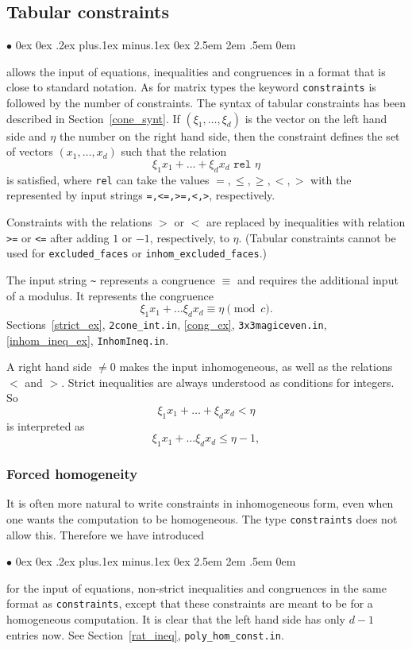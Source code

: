 \documentclass[12pt,a4paper]{scrartcl}
\newcommand{\stdli}{ \topsep0ex \partopsep0ex %
\parsep.2ex plus.1ex minus.1ex \itemsep0ex%
\leftmargin2.5em \labelwidth2em \labelsep.5em \rightmargin0em}%
\renewenvironment{itemize}{\begin{list}{{$\bullet$}}{\stdli}}{\end{list}}
\theoremstyle{definition}
\def\itemtt[#1]{\item[\textbf{\ttt{#1}}]}
\def\ttt{\texttt}
\begin{document}
\subsection{Tabular constraints}

\begin{itemize}
	\itemtt[constraints] allows the input of equations, inequalities and congruences in a format that is close to standard notation. As for matrix types the keyword \verb|constraints| is followed by the number of constraints. The syntax of tabular constraints has been described in Section~\ref{cone_synt}. If $(\xi_1,\dots,\xi_d)$ is the vector on the left hand side and $\eta$ the number on the right hand side, then the constraint defines the set of vectors $(x_1,\dots,x_d)$ such that the relation
	$$
	\xi_1x_1+\dots +\xi_dx_d \texttt{ rel } \eta
	$$
	is satisfied, where \verb|rel| can take the values $=,\leq,\geq,<,>$ with the represented by input strings \verb|=,<=,>=,<,>|, respectively.
	
	Constraints with the relations $>$ or $<$ are replaced by inequalities with relation \verb|>=| or \verb|<=| after adding $1$ or $-1$, respectively, to $ \eta$. (Tabular constraints cannot be used for \verb|excluded_faces| or \verb|inhom_excluded_faces|.)
	
	The input string \verb|~| represents a congruence $\equiv$ and requires the additional input of a modulus. It represents the congruence
	$$
	\xi_1x_1+\dots \xi_dx_d \equiv \eta \pmod c.
	$$
	Sections~\ref{strict_ex}, \verb|2cone_int.in|, \ref{cong_ex}, \ttt{3x3magiceven.in}, \ref{inhom_ineq_ex}, \verb|InhomIneq.in|.
\end{itemize}

A right hand side $\neq 0$ makes the input inhomogeneous, as well as the relations $<$ and $>$. Strict inequalities are always understood as conditions for integers. So
$$
\xi_1x_1+\dots +\xi_dx_d < \eta
$$
is interpreted as
$$
\xi_1x_1+\dots \xi_dx_d \le \eta-1,
$$


\subsubsection{Forced homogeneity}

It is often more natural to write constraints in inhomogeneous form, even when one wants the computation to be homogeneous. The type \verb|constraints| does not allow this. Therefore we have introduced
\begin{itemize}
	\itemtt[hom\_constraints] for the input of equations, non-strict inequalities and congruences in the same format as \verb|constraints|, except that these constraints are meant to be for a homogeneous computation. It is clear that the left hand side has only $d-1$ entries now. See Section~\ref{rat_ineq}, \verb|poly_hom_const.in|.
\end{itemize}
\end{document}
